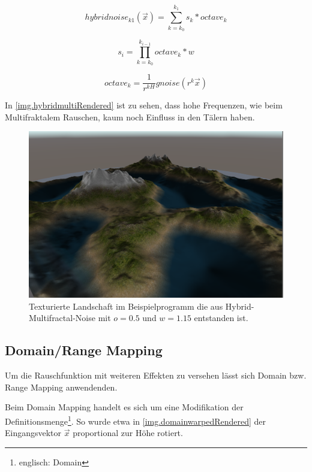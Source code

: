 \begin{equation}
hybridnoise_{k1}(\vec{x}) = \sum_{k=k_0}^{k_1}s_k*octave_k
\end{equation}

\begin{equation}
s_i=\prod_{k=k_0}^{k_{i-1}}octave_k*w
\end{equation}

\begin{equation}
octave_k=\frac{1}{r^{kH}}gnoise(r^k\vec{x})
\end{equation}


In \autoref{img.hybridmultiRendered} ist zu sehen, dass hohe Frequenzen, wie beim Multifraktalem Rauschen, kaum noch Einfluss in den Tälern haben. 

\begin{figure}
	\centering
	\includegraphics[width=\textwidth]{images/hybridmulti_rendered.png}
	\caption{Texturierte Landschaft im Beispielprogramm die aus Hybrid-Multifractal-Noise mit $o=0.5$ und $w=1.15$ entstanden ist.}\label{img.hybridmultiRendered}
\end{figure}





\subsection{Domain/Range Mapping}
Um die Rauschfunktion mit weiteren Effekten zu versehen lässt sich Domain bzw. Range Mapping anwendenden. 

Beim Domain Mapping handelt es sich um eine Modifikation der Definitionsmenge\footnote{englisch: Domain}. So wurde etwa in \autoref{img.domainwarpedRendered} der Eingangsvektor $\vec{x}$ proportional zur Höhe rotiert.

